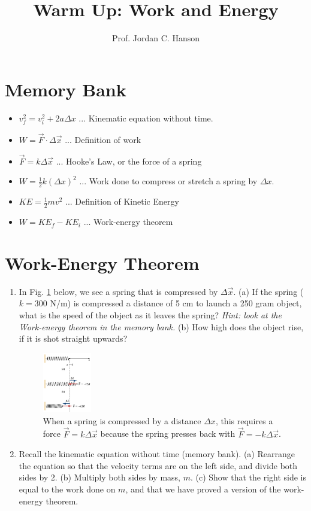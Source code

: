 \documentclass{article}
\begin{document}
\title{Warm Up: Work and Energy}
\author{Prof. Jordan C. Hanson}

\maketitle

\section{Memory Bank}

\begin{itemize}
\item $v_f^2 = v_i^2 + 2 a \Delta x$ ... Kinematic equation without time.
\item $W = \vec{F} \cdot \Delta \vec{x}$ ... Definition of work
\item $\vec{F} = k\Delta \vec{x}$ ... Hooke's Law, or the force of a spring
\item $W = \frac{1}{2}k(\Delta x)^2$ ... Work done to compress or stretch a spring by $\Delta x$.
\item $KE = \frac{1}{2}m v^2$ ... Definition of Kinetic Energy
\item $W = KE_f - KE_i$ ... Work-energy theorem
\end{itemize}

\section{Work-Energy Theorem}

\begin{enumerate}
\item In Fig. \ref{fig:work} below, we see a spring that is compressed by $\Delta \vec{x}$.  (a) If the spring ($k = 300$ N/m) is compressed a distance of 5 cm to launch a 250 gram object, what is the speed of the object as it leaves the spring?  \textit{Hint: look at the Work-energy theorem in the memory bank.} (b) How high does the object rise, if it is shot straight upwards? \\ \vspace{2cm}
\begin{figure}
\centering
\includegraphics[width=0.2\textwidth]{figures/springWork.png}
\caption{\label{fig:work} When a spring is compressed by a distance $\Delta x$, this requires a force $\vec{F} = k\Delta \vec{x}$ because the spring presses back with $\vec{F} = -k\Delta \vec{x}$.}
\end{figure}
\item Recall the kinematic equation without time (memory bank). (a) Rearrange the equation so that the velocity terms are on the left side, and divide both sides by 2.  (b) Multiply both sides by mass, $m$.  (c) Show that the right side is equal to the work done on $m$, and that we have proved a version of the work-energy theorem.
\end{enumerate}
\end{document}
